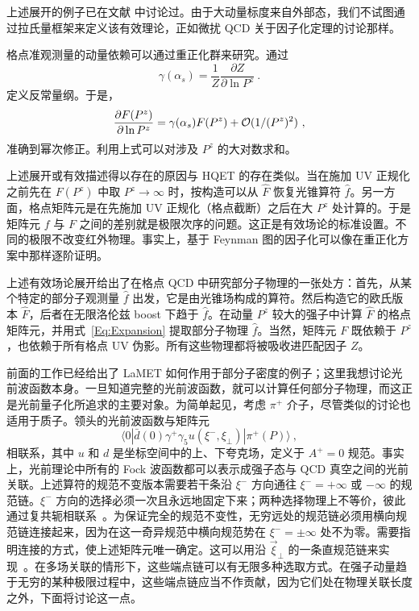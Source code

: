 上述展开的例子已在文献 \cite{Ji:2013dva, Ji:2013fga} 中讨论过。由于大动量标度来自外部态，我们不试图通过拉氏量框架来定义该有效理论，正如微扰 QCD 关于因子化定理的讨论那样。


格点准观测量的动量依赖可以通过重正化群来研究。通过
\begin{equation}
            \gamma(\alpha_s) = \frac{1}{Z}\frac{\partial Z}{\partial \ln P^z} \ .
\end{equation}
定义反常量纲。于是，
\begin{equation}
            \frac{\partial F(P^z)}{\partial \ln P^z} = \gamma(\alpha_s) F(P^z) + {\cal O}(1/(P^z)^2) \ ,
\end{equation}
准确到幂次修正。利用上式可以对涉及 $P^z$ 的大对数求和。


上述展开或有效描述得以存在的原因与 HQET 的存在类似。当在施加 UV 正规化之前先在 $F(P^z)$ 中取 $P^z\rightarrow \infty$ 时，按构造可以从 $\hat F$ 恢复光锥算符 $\hat f$。另一方面，格点矩阵元是在先施加 UV 正规化（格点截断）之后在大 $P^z$ 处计算的。于是矩阵元 $f$ 与 $F$ 之间的差别就是极限次序的问题。这正是有效场论的标准设置。不同的极限不改变红外物理。事实上，基于 Feynman 图的因子化可以像在重正化方案中那样逐阶证明。

上述有效场论展开给出了在格点 QCD 中研究部分子物理的一张处方：首先，从某个特定的部分子观测量 $\hat f$ 出发，它是由光锥场构成的算符。然后构造它的欧氏版本 $\hat F$，后者在无限洛伦兹 boost 下趋于 $\hat f$。在动量 $P^z$ 较大的强子中计算 $\hat F$ 的格点矩阵元，并用式~\ref{Eq:Expansion} 提取部分子物理 $\hat f$。当然，矩阵元 $F$ 既依赖于 $P^z$，也依赖于所有格点 UV 伪影。所有这些物理都将被吸收进匹配因子 $Z$。

前面的工作已经给出了 LaMET 如何作用于部分子密度的例子；这里我想讨论光前波函数本身。一旦知道完整的光前波函数，就可以计算任何部分子物理，而这正是光前量子化所追求的主要对象。为简单起见，考虑 $\pi^+$ 介子，尽管类似的讨论也适用于质子。领头的光前波函数与矩阵元
\begin{equation}
  \langle 0|\bar d(0)\gamma^+\gamma_5 u(\xi^-,\xi_\perp)|\pi^+(P)\rangle \ ,
\label{Eq:meson}
\end{equation}
相联系，其中 $u$ 和 $d$ 是坐标空间中的上、下夸克场，定义于 $A^+=0$ 规范。事实上，光前理论中所有的 Fock 波函数都可以表示成强子态与 QCD 真空之间的光前关联。上述算符的规范不变版本需要若干条沿 $\xi^-$ 方向通往 $\xi^- =+\infty$ 或 $-\infty$ 的规范链。$\xi^-$ 方向的选择必须一次且永远地固定下来；两种选择物理上不等价，彼此通过复共轭相联系~\cite{Ji:2002xn,Ji:2003yj}。为保证完全的规范不变性，无穷远处的规范链必须用横向规范链连接起来，因为在这一奇异规范中横向规范势在 $\xi^-=\pm \infty$ 处不为零。需要指明连接的方式，使上述矩阵元唯一确定。这可以用沿 $\vec{\xi}_\perp$ 的一条直规范链来实现~\cite{Ji:2002aa}。在多场关联的情形下，这些端点链可以有无限多种选取方式。在强子动量趋于无穷的某种极限过程中，这些端点链应当不作贡献，因为它们处在物理关联长度之外，下面将讨论这一点。

